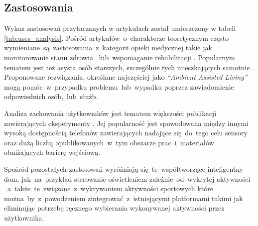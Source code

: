 \subsection{Zastosowania}
Wykaz zastosowań przytaczanych w artykułach został umieszczony w tabeli \ref{tab:uses_analysis}. Pośród artykułów~o~charakterze teoretycznym często wymieniane~są~zastosowania~z~kategorii opieki medycznej takie jak monitorowanie stanu zdrowia \cite{S22}~lub~wspomaganie rehabilitacji \cite{S35}. Popularnym tematem jest też asysta osób starszych, szczególnie tych mieszkających samotnie \cite{S21}. Proponowane rozwiązania, określane najczęściej jako \textit{``Ambient Assisted Living''} mogą pomóc~w~przypadku problemu~lub~wypadku poprzez zawiadomienie odpowiednich osób,~lub~służb.

Analiza zachowania użytkowników jest tematem większości publikacji zawierających eksperymenty \cite{S02, S59, S33}. Jej popularność jest spowodowana między innymi wysoką dostępnością telefonów zawierających nadające się~do~tego celu sensory oraz dużą liczbą opublikowanych~w~tym obszarze prac~i~materiałów obniżających barierę wejściową.

Spośród pozostałych zastosowań wyróżniają się~te~współtworzące inteligentny dom, jak~na~przykład sterowanie oświetleniem zależnie~od~wykrytej aktywności \cite{S36}~a~także~te~związane~z~wykrywaniem aktywności sportowych \cite{S29} które można~by~z~powodzeniem zintegrować~z~istniejącymi platformami takimi jak  eliminując potrzebę ręcznego wybierania wykonywanej aktywności przez użytkownika.

